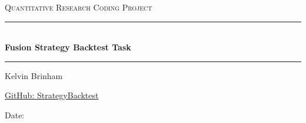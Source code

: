 
\begin{titlepage}

\centering

\vspace*{5cm}


\begin{center}





\textsc{\Large Quantitative Research  Coding Project}\\[0.4cm]


\newcommand{\HRule}{\rule{\linewidth}{0.5mm}}

\HRule \\[0.4cm]
{\huge \bfseries Fusion Strategy Backtest Task}\\
[-0.2cm]
\HRule

\Large Kelvin Brinham

\end{center}


\vspace{0.5cm}
\large
\href{https://github.com/kelvinbrinham/StrategyBacktest}{\color{highlight} GitHub: StrategyBacktest}



\normalsize
\makeatletter
Date: \@date


\end{titlepage}
